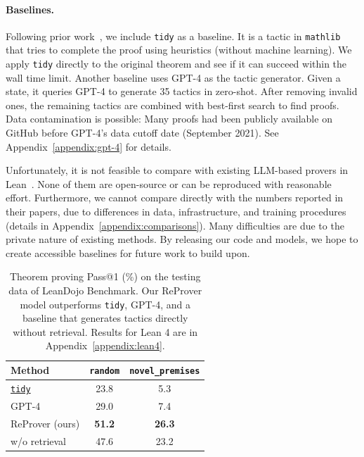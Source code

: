 \documentclass{article}
\newcommand{\smallsec}[1]{\vspace{-1mm} \paragraph{#1.}}
\newcommand\name{ReProver}
\begin{document}




\smallsec{Baselines}
Following prior work~\cite{han2022proof,zheng2022minif2f}, we include \texttt{tidy} as a baseline. It is a tactic in \texttt{mathlib} that tries to complete the proof using heuristics (without machine learning). We apply \texttt{tidy} directly to the original theorem and see if it can succeed within the wall time limit. Another baseline uses GPT-4 as the tactic generator. Given a state, it queries GPT-4 to generate 35 tactics in zero-shot. After removing invalid ones, the remaining tactics are combined with best-first search to find proofs. Data contamination is possible: Many proofs had been publicly available on GitHub before GPT-4's data cutoff date (September 2021). See Appendix~\ref{appendix:gpt-4} for details.

Unfortunately, it is not feasible to compare with existing LLM-based provers in Lean~\cite{han2022proof,polu2023formal,lample2022hypertree}. None of them are open-source or can be reproduced with reasonable effort. Furthermore, we cannot compare directly with the numbers reported in their papers, due to differences in data, infrastructure, and training procedures (details in Appendix~\ref{appendix:comparisons}). Many difficulties are due to the private nature of existing methods. By releasing our code and models, we hope to create accessible baselines for future work to build upon.



\begin{table}[ht]
  \centering
  \caption{Theorem proving Pass@1 (\%) on the testing data of LeanDojo Benchmark. Our {\name} model outperforms \texttt{tidy}, GPT-4, and a baseline that generates tactics directly without retrieval. Results for Lean 4 are in Appendix~\ref{appendix:lean4}.}
  \begin{tabular}{@{}lcc@{}}
    \toprule
     Method & \texttt{random} & \texttt{novel\_premises} \\
    \midrule
    \href{https://leanprover-community.github.io/mathlib_docs/tactic/tidy.html#tactic.tidy}{\texttt{tidy}} & 23.8 & 5.3 \\
    GPT-4 & 29.0 & 7.4 \\
    {\name} (ours) & \textbf{51.2} & \textbf{26.3} \\
    \quad w/o retrieval & 47.6 & 23.2 \\
    \bottomrule
  \end{tabular}
  \label{table:theorem_proving_results}
\end{table}
\end{document}
